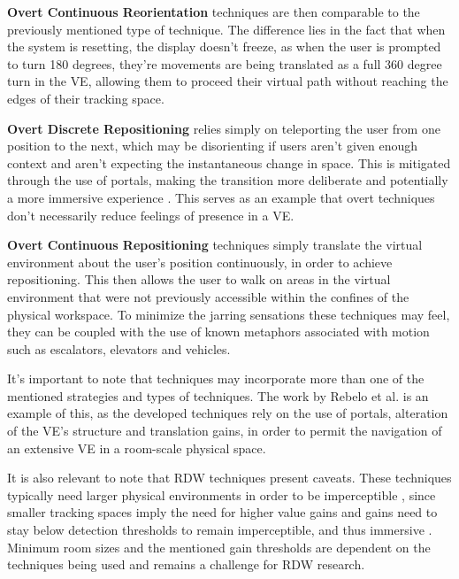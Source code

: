 \textbf{Overt Continuous Reorientation} techniques are then comparable to the previously mentioned type of technique. The difference lies 
in the fact that when the system is resetting, the display doesn't freeze, as when the user is prompted to turn 180 degrees, they're movements 
are being translated as a full 360 degree turn in the \gls{VE}, allowing them to proceed their virtual path without reaching the edges of 
their tracking space.

\textbf{Overt Discrete Repositioning} relies simply on teleporting the user from one position to the next, which may be disorienting if 
users aren't given enough context and aren't expecting the instantaneous change in space. This is mitigated through the use of portals, 
making the transition more deliberate and potentially a more immersive experience \cite{6180877}. This serves as an example that 
overt techniques don't necessarily reduce feelings of presence in a \gls{VE}. 

\textbf{Overt Continuous Repositioning} techniques simply translate the virtual environment about the user's position continuously, in order 
to achieve repositioning. This then allows the user to walk on areas in the virtual environment that were not previously
accessible within the confines of the physical workspace. To minimize the jarring sensations these techniques may feel, they can be coupled 
with the use of known metaphors associated with motion such as escalators, elevators and vehicles.

It's important to note that techniques may incorporate more than one of the mentioned strategies and types of techniques. The work by 
Rebelo et al. \cite{Rebelo2024} is an example of this, as the developed techniques rely on the use of portals, alteration of the \gls{VE}'s 
structure and translation gains, in order to permit the navigation of an extensive \gls{VE} in a room-scale physical space.

It is also relevant to note that \gls{RDW} techniques present caveats. These techniques typically need larger physical environments in order to be 
imperceptible \cite{Langbehn2018}, since smaller tracking spaces imply the need for higher value gains and gains need to stay below detection 
thresholds to remain imperceptible, and thus immersive \cite{Grechkin2016}. Minimum room sizes and the mentioned gain thresholds are dependent on 
the techniques being used and remains a challenge for \gls{RDW} research. 

